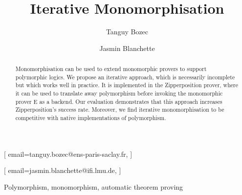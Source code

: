 \documentclass[]{ceurart}
\begin{document}


%
%

\title{Iterative Monomorphisation}

\author[1,2]{Tanguy Bozec}[%
email=tanguy.bozec@ens-paris-saclay.fr,
]
\author[2]{Jasmin Blanchette}[%
email=jasmin.blanchette@ifi.lmu.de,
]
\address[1]{ENS Paris-Saclay, Université Paris-Saclay, France}
\address[2]{Institute of Informatics, Ludwig-Maximilians-Universität München, Germany}


\begin{abstract}
Monomorphisation can be used to extend monomorphic provers to support polymorphic logics. We propose an iterative approach, which is necessarily incomplete but which works well in practice. It is implemented in the Zipperposition prover, where it can be used to translate away polymorphism before invoking the monomorphic prover E as a backend. Our evaluation demonstrates that this approach increases Zipperposition's success rate. Moreover, we find iterative monomorphisation to be competitive with native implementations of polymorphism.
\end{abstract}

\begin{keywords}
   Polymorphism\sep
   monomorphism\sep
   automatic theorem proving
\end{keywords}

\maketitle
\end{document}
